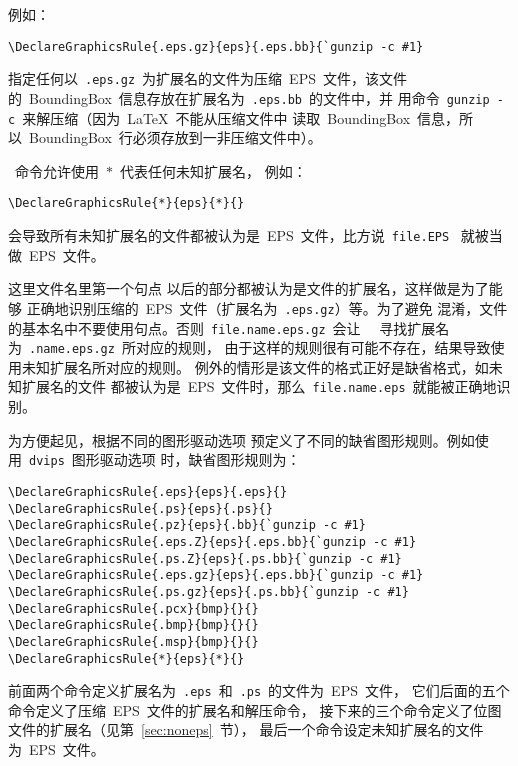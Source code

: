 例如：
\begin{Verbatim}[xleftmargin=1cm]
\DeclareGraphicsRule{.eps.gz}{eps}{.eps.bb}{`gunzip -c #1}
\end{Verbatim}
指定任何以~\texttt{.eps.gz}~为扩展名的文件为压缩~EPS~文件，该文件
的~BoundingBox~信息存放在扩展名为~\texttt{.eps.bb}~的文件中，并
用命令~\texttt{gunzip -c}~来解压缩（因为~\LaTeX{}~不能从压缩文件中
读取~BoundingBox~信息，所以~BoundingBox~行必须存放到一非压缩文件中）。

~命令允许使用~$\ast$~代表任何未知扩展名，
例如：
\begin{Verbatim}[xleftmargin=1cm]
\DeclareGraphicsRule{*}{eps}{*}{}
\end{Verbatim}
会导致所有未知扩展名的文件都被认为是~EPS~文件，比方说~\texttt{file.EPS}~
就被当做~EPS~文件。

这里文件名里第一个句点 
以后的部分都被认为是文件的扩展名，这样做是为了能够
正确地识别压缩的~EPS~文件（扩展名为~\texttt{.eps.gz}）等。为了避免
混淆，文件的基本名中不要使用句点。否则~\texttt{file.name.eps.gz}~会让
~~寻找扩展名为~\texttt{.name.eps.gz}~所对应的规则，
由于这样的规则很有可能不存在，结果导致使用未知扩展名所对应的规则。
例外的情形是该文件的格式正好是缺省格式，如未知扩展名的文件
都被认为是~EPS~文件时，那么~\texttt{file.name.eps}~就能被正确地识别。

为方便起见，根据不同的图形驱动选项
预定义了不同的缺省图形规则。例如使用~\texttt{dvips}~图形驱动选项
时，缺省图形规则为：

\begin{Verbatim}[xleftmargin=1cm]
\DeclareGraphicsRule{.eps}{eps}{.eps}{}
\DeclareGraphicsRule{.ps}{eps}{.ps}{}
\DeclareGraphicsRule{.pz}{eps}{.bb}{`gunzip -c #1}
\DeclareGraphicsRule{.eps.Z}{eps}{.eps.bb}{`gunzip -c #1}
\DeclareGraphicsRule{.ps.Z}{eps}{.ps.bb}{`gunzip -c #1}
\DeclareGraphicsRule{.eps.gz}{eps}{.eps.bb}{`gunzip -c #1}
\DeclareGraphicsRule{.ps.gz}{eps}{.ps.bb}{`gunzip -c #1}
\DeclareGraphicsRule{.pcx}{bmp}{}{}
\DeclareGraphicsRule{.bmp}{bmp}{}{}
\DeclareGraphicsRule{.msp}{bmp}{}{}
\DeclareGraphicsRule{*}{eps}{*}{}
\end{Verbatim}

前面两个命令定义扩展名为~\texttt{.eps}~和~\texttt{.ps}~的文件为~EPS~文件，
它们后面的五个命令定义了压缩~EPS~文件的扩展名和解压命令，
接下来的三个命令定义了位图文件的扩展名（见第~\ref{sec:noneps}~节），
最后一个命令设定未知扩展名的文件为~EPS~文件。

\endinput

